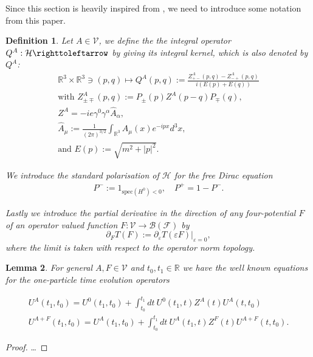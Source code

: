 \documentclass[b5paper,draft,openbib,12pt]{memoir}
\newtheorem{Def}{Definition}
\newtheorem{Lemma}[Def]{Lemma}
\begin{document}
Since this section is heavily inspired from \cite{ivp0}, we need
to introduce some notation from this paper. 
\begin{Def}
Let \(A\in\mathcal{V}\), we define the the integral operator
\(Q^A:\mathcal{H}\righttoleftarrow\) by giving its integral kernel, which 
is also denoted by \(Q^A\):
\begin{align}
\mathbb{R}^3\times\mathbb{R}^3\ni (p,q)\mapsto Q^A(p,q)
:=\frac{Z^A_{+-}(p,q)-Z^A_{-+}(p,q)}{i(E(p)+E(q))}\\
\text{with }Z^A_{\pm\mp}(p,q):=P_\pm (p)Z^A(p-q)P_\mp (q),\\
Z^A=-i e\gamma^0 \gamma^\alpha \hat{A}_\alpha,\\
\hat{A}_\mu := \frac{1}{(2\pi)^{3/2}}\int_{\mathbb{R}^3} A_\mu (x)e^{-i p x} d^3x,\\ 
\text{and } E(p):=\sqrt{m^2+|p|^2}.
\end{align}

We introduce the standard polarisation of \(\mathcal{H}\) for the free Dirac 
equation
\begin{align}
P^-:=1_{\mathrm{spec}(H^0)<0}, \quad P^+=1-P^-.
\end{align}

Lastly we introduce the partial derivative in 
the direction of any four-potential \(F\) of an operator valued 
function \(F:\mathcal{V}\rightarrow \mathcal{B}(\mathcal{F})\) by
\begin{equation}\label{def derivative}
\partial_F T(F):=\partial_{\varepsilon}T(\varepsilon F)|_{\varepsilon =0},
\end{equation}
where the limit is taken with respect to the operator norm topology.
\end{Def}



\begin{Lemma}
For general \(A,F\in\mathcal{V}\) and \(t_0,t_1\in\mathbb{R}\) 
we have the well known equations for
the one-particle time evolution operators

\begin{align}
U^A(t_1,t_0)=U^0(t_1,t_0) + \int_{t_0}^{t_1}dt~ U^0(t_1,t) Z^A(t) U^{A}(t,t_0)\\
U^{A+F}(t_1,t_0)=U^A(t_1,t_0) + \int_{t_0}^{t_1}dt ~U^A(t_1,t) Z^F(t) U^{A+F}(t,t_0).
\end{align}
\end{Lemma}
\begin{proof}
\dots
\end{proof}
\end{document}
